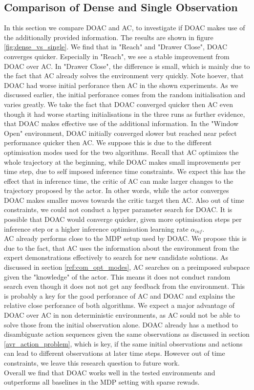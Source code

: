 \subsection{Comparison of Dense and Single Observation}
In this section we compare DOAC and AC, to investigate if DOAC makes use of the additionally provided information. The results are shown in figure \ref{fig:dense_vs_single}.
We find that in "Reach" and "Drawer Close", DOAC converges quicker. Especially in "Reach", we see a stable improvement from DOAC over AC. In "Drawer Close", the difference is 
small, which is mainly due to the fact that AC already solves the environment very quickly. Note hoever, that DOAC had worse initial perforance then AC in the shown experiments. 
As we discussed earlier, the initial perforance comes from the random initialisation and varies greatly. We take the fact that DOAC converged quicker then AC even though it had 
worse starting initialisations in the three runs as further evidence, that DOAC makes effective use of the additional information. In the "Window Open" environment, DOAC initially converged slower but 
reached near pefect performance quicker then AC. We suppose this is due to the different optimisation modes used for the two algorithms. Recall that AC optimizes the whole 
trajectory at the beginning, while DOAC makes small improvements per time step, due to self imposed inference time constraints. We expect this has the effect that in inference time, the critic of 
AC can make larger changes to the trajectory proposed by the actor. In other words, while the actor converges DOAC makes smaller moves towards the critic target then AC. Also out of time constraints, we could 
not conduct a hyper parameter search for DOAC. It is possible that DOAC would converge quicker, given more optimisation steps per inference step or a higher inference optimisation 
learning rate $\alpha_{inf}$.\\ 
AC already performs close to the MDP setup used by DOAC. We propose this is due to the fact, that AC uses the information about the environment 
from the expert demonstrations effectively to search for new candidate solutions. As discussed in section \ref{ref:com_opt_modes}, AC searches on a preimposed subspace given the "knowledge" of the 
actor. This means it does not conduct random search even though it does not not get any feedback from the environment. This is probably a key for the good perforance of AC and DOAC and explains 
the relative close perforance of both algorithms. We expect a major advantage of DOAC over AC in non deterministic environments, as AC sould not be able to solve those from the initial 
observation alone. DOAC already has a method to disambiguate action sequences given the same observations as discussed in section \ref{avr_action_problem}, which is key, if the same initial 
observations and actions can lead to different observations at later time steps. However out of time constraints, we leave this research question to future work.\\
Overall we find that DOAC works well in the tested environments and outperforms all baselines in the MDP setting with sparse rewads.

